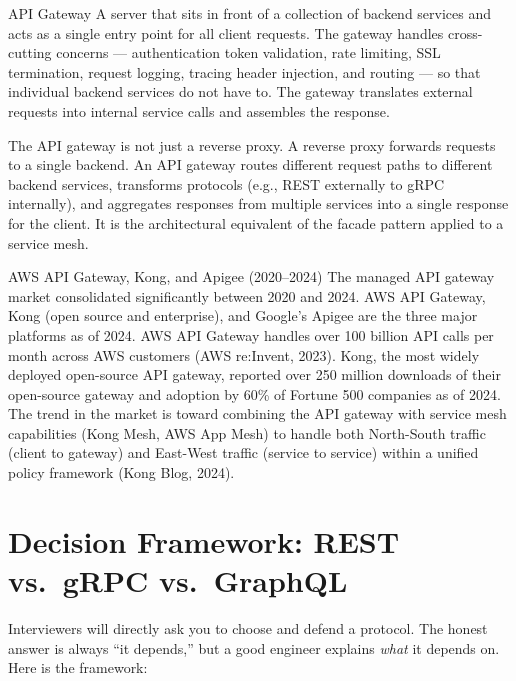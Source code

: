 \documentclass[11pt,a4paper]{article}
\begin{document}
\begin{termbox}{API Gateway}
A server that sits in front of a collection of backend services and acts as a single entry point for all client requests. The gateway handles cross-cutting concerns --- authentication token validation, rate limiting, SSL termination, request logging, tracing header injection, and routing --- so that individual backend services do not have to. The gateway translates external requests into internal service calls and assembles the response.
\end{termbox}

The API gateway is not just a reverse proxy. A reverse proxy forwards requests to a single backend. An API gateway routes different request paths to different backend services, transforms protocols (e.g., REST externally to gRPC internally), and aggregates responses from multiple services into a single response for the client. It is the architectural equivalent of the facade pattern applied to a service mesh.

\begin{industrybox}{AWS API Gateway, Kong, and Apigee (2020--2024)}
The managed API gateway market consolidated significantly between 2020 and 2024. AWS API Gateway, Kong (open source and enterprise), and Google's Apigee are the three major platforms as of 2024. AWS API Gateway handles over 100 billion API calls per month across AWS customers (AWS re:Invent, 2023). Kong, the most widely deployed open-source API gateway, reported over 250 million downloads of their open-source gateway and adoption by 60\% of Fortune 500 companies as of 2024. The trend in the market is toward combining the API gateway with service mesh capabilities (Kong Mesh, AWS App Mesh) to handle both North-South traffic (client to gateway) and East-West traffic (service to service) within a unified policy framework (Kong Blog, 2024).
\end{industrybox}

\section{Decision Framework: REST vs.\ gRPC vs.\ GraphQL}

Interviewers will directly ask you to choose and defend a protocol. The honest answer is always ``it depends,'' but a good engineer explains \emph{what} it depends on. Here is the framework:
\end{document}
